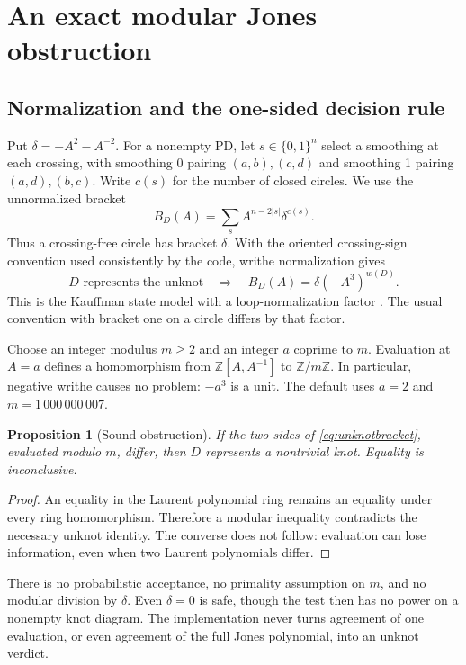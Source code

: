 \documentclass[11pt,a4paper]{article}
\newtheorem{proposition}[theorem]{Proposition}
\theoremstyle{definition}\newtheorem{remark}[theorem]{Remark}
\begin{document}
\section{An exact modular Jones obstruction}
\label{sec:jones}
\subsection{Normalization and the one-sided decision rule}
Put $\delta=-A^2-A^{-2}$. For a nonempty PD, let $s\in\{0,1\}^n$ select a
smoothing at each crossing, with smoothing 0 pairing $(a,b),(c,d)$ and smoothing
1 pairing $(a,d),(b,c)$. Write $c(s)$ for the number of closed circles. We use
the unnormalized bracket
\begin{equation}
B_D(A)=\sum_s A^{n-2|s|}\delta^{c(s)}.
\label{eq:bracket}
\end{equation}
Thus a crossing-free circle has bracket $\delta$. With the oriented crossing-sign
convention used consistently by the code, writhe normalization gives
\begin{equation}
D\text{ represents the unknot}\quad\Longrightarrow\quad
B_D(A)=\delta(-A^3)^{w(D)}.
\label{eq:unknotbracket}
\end{equation}
This is the Kauffman state model with a loop-normalization factor
\cite{Kauffman}. The usual convention with bracket one on a circle differs by
that factor.

Choose an integer modulus $m\ge2$ and an integer $a$ coprime to $m$. Evaluation
at $A=a$ defines a homomorphism from $\mathbb Z[A,A^{-1}]$ to
$\mathbb Z/m\mathbb Z$. In particular, negative writhe causes no problem:
$-a^3$ is a unit. The default uses $a=2$ and $m=1\,000\,000\,007$.

\begin{proposition}[Sound obstruction]
If the two sides of \eqref{eq:unknotbracket}, evaluated modulo $m$, differ, then
$D$ represents a nontrivial knot. Equality is inconclusive.
\end{proposition}
\begin{proof}
An equality in the Laurent polynomial ring remains an equality under every ring
homomorphism. Therefore a modular inequality contradicts the necessary unknot
identity. The converse does not follow: evaluation can lose information, even
when two Laurent polynomials differ.
\end{proof}

There is no probabilistic acceptance, no primality assumption on $m$, and no
modular division by $\delta$. Even $\delta=0$ is safe, though the test then has no
power on a nonempty knot diagram. The implementation never turns agreement of
one evaluation, or even agreement of the full Jones polynomial, into an unknot
verdict.
\end{document}
